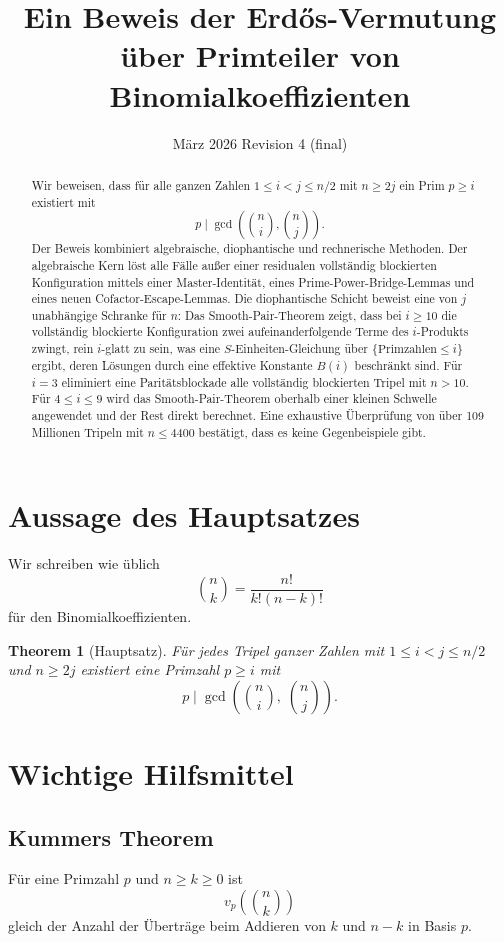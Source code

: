 \documentclass[12pt,a4paper]{article}
\title{Ein Beweis der Erd\H{o}s-Vermutung über Primteiler von Binomialkoeffizienten}
\author{}
\date{März 2026 \quad Revision 4 (final)}
\theoremstyle{plain}
\newtheorem{theorem}{Theorem}[section]
\theoremstyle{definition}
\theoremstyle{remark}
\begin{document}
	
	\maketitle
	
	\begin{abstract}
		Wir beweisen, dass für alle ganzen Zahlen $1 \leq i < j \leq n/2$ mit $n \geq 2j$ ein Prim $p \geq i$ existiert mit
		\[
		p \mid \gcd\!\left(\binom{n}{i},\binom{n}{j}\right).
		\]
		Der Beweis kombiniert algebraische, diophantische und rechnerische Methoden. Der algebraische Kern löst alle Fälle außer einer residualen vollständig blockierten Konfiguration mittels einer Master-Identität, eines Prime-Power-Bridge-Lemmas und eines neuen Cofactor-Escape-Lemmas. Die diophantische Schicht beweist eine von $j$ unabhängige Schranke für $n$: Das Smooth-Pair-Theorem zeigt, dass bei $i \geq 10$ die vollständig blockierte Konfiguration zwei aufeinanderfolgende Terme des $i$-Produkts zwingt, rein $i$-glatt zu sein, was eine $S$-Einheiten-Gleichung über $\{\text{Primzahlen} \leq i\}$ ergibt, deren Lösungen durch eine effektive Konstante $B(i)$ beschränkt sind. Für $i=3$ eliminiert eine Paritätsblockade alle vollständig blockierten Tripel mit $n>10$. Für $4 \leq i \leq 9$ wird das Smooth-Pair-Theorem oberhalb einer kleinen Schwelle angewendet und der Rest direkt berechnet. Eine exhaustive Überprüfung von über 109 Millionen Tripeln mit $n \leq 4400$ bestätigt, dass es keine Gegenbeispiele gibt.
	\end{abstract}
	
	\section{Aussage des Hauptsatzes}
	
	Wir schreiben wie üblich
	\[
	\binom{n}{k} = \frac{n!}{k!(n-k)!}
	\]
	für den Binomialkoeffizienten.
	
	\begin{theorem}[Hauptsatz]
		Für jedes Tripel ganzer Zahlen mit $1 \leq i < j \leq n/2$ und $n \geq 2j$ existiert eine Primzahl $p \geq i$ mit
		\[
		p \mid \gcd\!\left( \binom{n}{i},\; \binom{n}{j} \right).
		\]
	\end{theorem}
	
	\section{Wichtige Hilfsmittel}
	
	\subsection{Kummers Theorem}
	Für eine Primzahl $p$ und $n \geq k \geq 0$ ist
	\[
	v_p\!\left(\binom{n}{k}\right)
	\]
	gleich der Anzahl der Überträge beim Addieren von $k$ und $n-k$ in Basis $p$.
	
\end{document}
